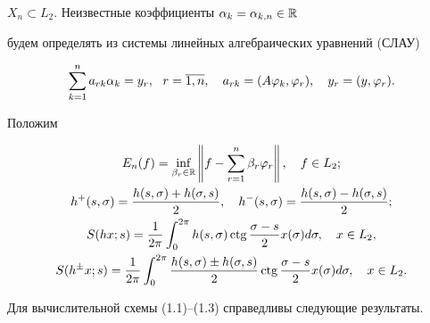 $X_n\subset L_2$. Неизвестные коэффициенты $\alpha_k = \alpha_{k,n}\in \Bbb R$


будем определять из системы линейных алгебраических уравнений (СЛАУ)


\begin{equation}


\suml_{k=1}^n a_{rk}\alpha_{k} = y_r,\ \ r=\overline{1,n},\quad


a_{rk} = (A\vp_k,\vp_r), \quad y_r=(y,\vp_r).


\end{equation}


\addtocounter{footnote}{-1}





Положим


\begin{gather*}


E_n(f) = \inf_{\beta_r\in \R}\left\|f -


\suml_{r=1}^n\beta_r\vp_r\right\|,\quad f\in L_2; \\


%


h^+(s,\si)=\frac{h(s,\si)+h(\si,s)}{2},\quad h^-(s,\si) = \frac{h(s,\si)-


h(\si,s)}{2}; \\


%


S(hx;s)=\frac{1}{2\pi}\int_{0}^{2\pi}h(s,\si)\ctg\frac{\si-


s}{2}x(\si)d\si,\quad x\in L_2, \\


%


S(h^{\pm}x;s) = \frac{1}{2\pi}\int_{0}^{2\pi}\frac{h(s,\sigma)\pm


h(\sigma,s)}{2}\ctg\frac{\si-s}{2}x(\si)d\si,\quad x\in L_2.


\end{gather*}





Для вычислительной схемы (1.1)--(1.3) справедливы следующие результаты.





